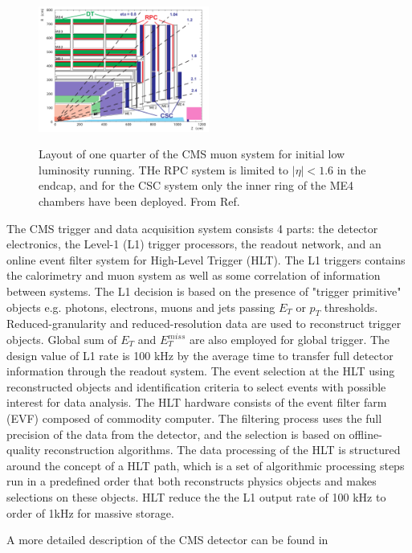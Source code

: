 \begin{figure}[!h]
    \centering
    \caption{Layout of one quarter of the CMS muon system for initial low luminosity running. THe RPC system is limited to $|\eta| < 1.6$ in the endcap, and for the CSC system only the inner ring of the ME4 chambers have been deployed. From Ref.\cite{cmstdr}}
    \includegraphics[width=0.5\textwidth]{fig/muonsystem.png}
    \label{fig:muonsystem}
\end{figure}

The CMS trigger and data acquisition system consists 4 parts: the detector electronics, the Level-1 (L1) trigger processors, the readout network, and an online event filter system for High-Level Trigger (HLT). The L1 triggers contains the calorimetry and muon system as well as some correlation of information between systems. The L1 decision is based on the presence of "trigger primitive" objects e.g. photons, electrons, muons and jets passing $E_T$ or $p_T$ thresholds. Reduced-granularity and reduced-resolution data are used to reconstruct trigger objects. Global sum of $E_T$ and $E_T^{miss}$ are also employed for global trigger.  The design value of L1 rate is 100 kHz by the average time to transfer full detector information through the readout system. The event selection at the HLT using reconstructed objects and identification criteria to select events with possible interest for data analysis. The HLT hardware consists of the event filter farm (EVF) composed of commodity computer. The filtering process uses the full precision of the data from the detector, and the selection is based on offline-quality reconstruction algorithms. The data processing of the HLT is structured around the concept of a HLT path, which is a set of algorithmic processing steps run in a predefined order that both reconstructs physics objects and makes selections on these objects. HLT reduce the the L1 output rate of 100 kHz to order of 1kHz for massive storage.

A more detailed description of the CMS detector can be found in  \cite{adolphi2008cms}
